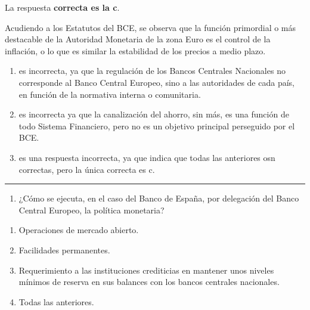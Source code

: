 \documentclass[
  letterpaper,
  DIV=11,
  numbers=noendperiod]{scrreprt}
\providecommand{\tightlist}{%
  \setlength{\itemsep}{0pt}\setlength{\parskip}{0pt}}\usepackage{longtable,booktabs,array}
\begin{document}
\begin{tcolorbox}[enhanced jigsaw, left=2mm, opacityback=0, colback=white, breakable, arc=.35mm, bottomrule=.15mm, rightrule=.15mm, toprule=.15mm, leftrule=.75mm, colframe=quarto-callout-tip-color-frame]
\begin{minipage}[t]{5.5mm}
\textcolor{quarto-callout-tip-color}{\faLightbulb}
\end{minipage}%
\begin{minipage}[t]{\textwidth - 5.5mm}

La respuesta \textbf{correcta es la c}.

Acudiendo a los Estatutos del BCE, se observa que la función primordial
o más destacable de la Autoridad Monetaria de la zona Euro es el control
de la inflación, o lo que es similar la estabilidad de los precios a
medio plazo.

\begin{enumerate}
\def\labelenumi{\alph{enumi})}
\item
  es incorrecta, ya que la regulación de los Bancos Centrales Nacionales
  no corresponde al Banco Central Europeo, sino a las autoridades de
  cada país, en función de la normativa interna o comunitaria.
\item
  es incorrecta ya que la canalización del ahorro, sin más, es una
  función de todo Sistema Financiero, pero no es un objetivo principal
  perseguido por el BCE.
\item
  es una respuesta incorrecta, ya que indica que todas las anteriores
  osn correctas, pero la única correcta es c.
\end{enumerate}

\end{minipage}%
\end{tcolorbox}

\begin{center}\rule{0.5\linewidth}{0.5pt}\end{center}

\begin{enumerate}
\def\labelenumi{\arabic{enumi}.}
\setcounter{enumi}{20}
\tightlist
\item
  ¿Cómo se ejecuta, en el caso del Banco de España, por delegación del
  Banco Central Europeo, la política monetaria?
\end{enumerate}

\begin{enumerate}
\def\labelenumi{\alph{enumi})}
\item
  Operaciones de mercado abierto.
\item
  Facilidades permanentes.
\item
  Requerimiento a las instituciones crediticias en mantener unos niveles
  mínimos de reserva en sus balances con los bancos centrales
  nacionales.
\item
  Todas las anteriores.
\end{enumerate}
\end{document}
